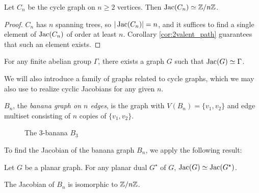 \documentclass{amsart}
\begin{document}
\begin{cor}
  \label{prop:cycle_cyclic}
  Let $C_n$ be the cycle graph on $n \ge 2$ vertices. Then $\operatorname{Jac}(C_n) \simeq
  \mathbb{Z}/n\mathbb{Z}$.
\end{cor}
\begin{proof}
  $C_n$ has $n$ spanning trees, so $|\operatorname{Jac}(C_n)|=n$, and it suffices to
  find a single element of $\operatorname{Jac}(C_n)$ of order at least
  $n$. Corollary \ref{cor:2valent_path} guarantees that such an
  element exists.
\end{proof}

\begin{cor}\cite[Corollary 1.3]{CR2000}
  For any finite abelian group $\Gamma$, there exists a graph $G$ such
  that $\operatorname{Jac}(G) \simeq \Gamma$. 
\end{cor}

We will also introduce a family of graphs related to cycle graphs,
which we may also use to realize cyclic Jacobians for any given $n$.

\begin{defn}
  $B_n$, the \emph{banana graph on $n$ edges}, is the graph with
  $V(B_n) = \{v_1, v_2\}$ and edge multiset consisting of $n$ copies of
  $\{v_1, v_2\}$.
\end{defn}

\begin{figure}[h]
  \begin{center}
    \caption{The $3$-banana $B_3$}
  \end{center}
\end{figure}

To find the Jacobian of the banana graph $B_n$, we apply the following
result:

\begin{thm}\cite[Theorem 2]{CR2000}
  \label{thm:graph_dual_iso}
  Let $G$ be a planar graph. For any planar dual $G^\star$ of $G$,
  $\operatorname{Jac}(G) \simeq \operatorname{Jac}(G^\star)$.
\end{thm}

\begin{prop}
  \label{prop:banana_cyclic}
  The Jacobian of $B_n$ is isomorphic to $\mathbb{Z}/n\mathbb{Z}$.
\end{prop}
\end{document}
